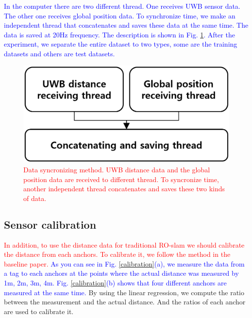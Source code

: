 \documentclass[letterpaper, 10 pt, conference]{ieeeconf}  %
\begin{document}
 \textcolor{blue}{In the computer there are two different thread. One receives UWB sensor data. The other one receives global position data. To synchronize time, we make an independent thread that concatenates and saves these data at the same time. The data is saved at 20Hz frequency. The description is shown in Fig. \ref{fig:sync}. After the experiment, we separate the entire dataset to two types, some are the training datasets and others are test datasets.}

\begin{figure}[h]
	\centering
	\includegraphics[width=.9\linewidth]{figure2}
	\caption{\textcolor{red}{Data syncronizing method. UWB distance data and the global position data are received to different thread. To syncronize time, another independent thread concatenates and saves these two kinds of data.}}
	\label{fig:sync}
\end{figure}

\subsection{Sensor calibration}
 \textcolor{red}{In addition, to use the distance data for traditional RO-slam we should calibrate the distance from each anchors. To calibrate it, we follow the method in the baseline paper.} \textcolor{blue}{As you can see in Fig. \ref{calibration}(a), we measure the data from a tag to each anchors at the points where the actual distance was measured by 1m, 2m, 3m, 4m. Fig. \ref{calibration}(b) shows that four different anchors are measured at the same time.} By using the linear regression, we compute the ratio between the measurement and the actual distance. And the ratios of each anchor are used to calibrate it.
\end{document}
